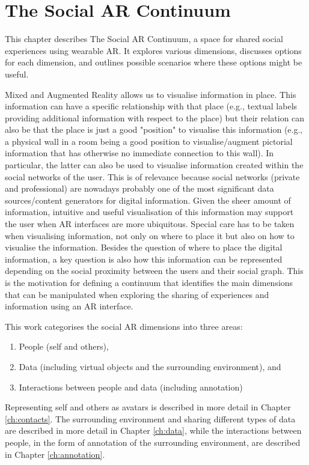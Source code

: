 \chapter{The Social AR Continuum}
\label{ch:continuum}

This chapter describes The Social AR Continuum, a space for shared social experiences using wearable AR. It explores various dimensions, discusses options for each dimension, and outlines possible scenarios where these options might be useful.

Mixed and Augmented Reality allows us to visualise information in place. This information can have a specific relationship with that place (e.g., textual labels providing additional information with respect to the place) but their relation can also be that the place is just a good "position" to visualise this information (e.g., a physical wall in a room being a good position to visualise/augment pictorial information that has otherwise no immediate connection to this wall). In particular, the latter can also be used to visualise information created within the social networks of the user. This is of relevance because social networks (private and professional) are nowadays probably one of the most significant data sources/content generators for digital information. Given the sheer amount of information, intuitive and useful visualisation of this information may support the user when AR interfaces are more ubiquitous. Special care has to be taken when visualising information, not only on where to place it but also on how to visualise the information. Besides the question of where to place the digital information, a key question is also how this information can be represented depending on the social proximity between the users and their social graph. This is the motivation for defining a continuum that identifies the main dimensions that can be manipulated when exploring the sharing of experiences and information using an AR interface. 

This work categorises the social AR dimensions into three areas: 
\begin{enumerate}
    \item People (self and others),
    \item Data (including virtual objects and the surrounding environment), and
    \item Interactions between people and data (including annotation)
\end{enumerate}

Representing self and others as avatars is described in more detail in Chapter \ref{ch:contacts}. The surrounding environment and sharing different types of data are described in more detail in Chapter \ref{ch:data}, while the interactions between people, in the form of annotation of the surrounding environment, are described in Chapter \ref{ch:annotation}.


